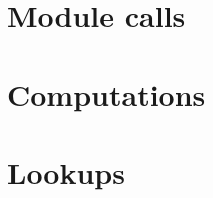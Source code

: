 \section{Module calls}                            \label{system transactions: module calls}                    

\section{Computations}                            \label{system transactions: computations}                    

\section{Lookups}                                 \label{system transactions: lookups}                         
